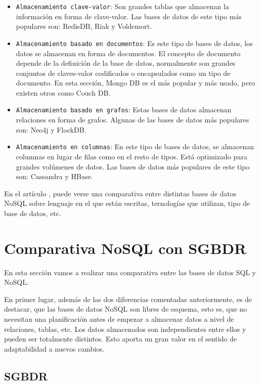 \begin{itemize}
    \item \texttt{Almacenamiento clave-valor}: Son grandes tablas que almacenan la información en forma de clave-valor. Las bases de datos de este tipo más populares son: RedisDB, Riak y Voldemort.
    \item \texttt{Almacenamiento basado en documentos}: Es este tipo de bases de datos, los datos se almacenan en forma de documentos. El concepto de documento depende de la definición de la base de datos, normalmente son grandes conjuntos de claves-valor codificados o encapsulados como un tipo de documento. En esta sección, Mongo DB es el más popular y más usado, pero existen otros como Couch DB.
    \item \texttt{Almacenamiento basado en grafos}: Estas bases de datos almacenan relaciones en forma de grafos. Algunas de las bases de datos más populares son: Neo4j y FlockDB.
    \item \texttt{Almacenamiento en columnas}: En este tipo de bases de datos, se almacenan columnas en lugar de filas como en el resto de tipos. Está optimizado para grandes volúmenes de datos. Las bases de datos más populares de este tipo son: Cassandra y HBase. 
\end{itemize}

En el artículo \cite{nosqlcomparativas}, puede verse una comparativa entre distintas bases de datos NoSQL sobre lenguaje en el que están escritas, ternologías que utilizan, tipo de base de datos, etc.

\section{Comparativa NoSQL con SGBDR}

En esta sección vamos a realizar una comparativa entre las bases de datos SQL y NoSQL.

En primer lugar, además de las dos diferencias comentadas anteriormente, es de destacar, que las bases de datos NoSQL son libres de esquema, esto es, que no necesitan una planificación antes de empezar a almacenar datos a nivel de relaciones, tablas, etc. Los datos almacenados son independientes entre ellos y pueden ser totalmente distintos. Esto aporta un gran valor en el sentido de adaptabilidad a nuevos cambios.

\subsection{SGBDR}

